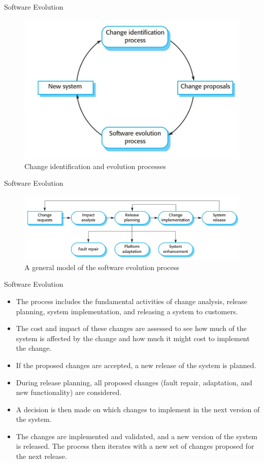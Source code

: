 \documentclass{beamer}
\begin{document}
\begin{frame}{Software Evolution}
	\begin{figure}
	\includegraphics[scale=.43]{img/m3_49}
	\caption{Change 
		identification and 
		evolution processes  }
\end{figure}
\end{frame}
\begin{frame}{Software Evolution}
	\begin{figure}
		\includegraphics[scale=.4]{img/m3_50}
		\caption{A general 
			model of the software 
			evolution process }
	\end{figure}
\end{frame}
\begin{frame}{Software Evolution}
\begin{itemize}
	\item The process includes the fundamental activities of change analysis, release planning, system implementation, and releasing a system to customers. 
\item The cost and impact of these changes are assessed to see how much of the system is affected by the change and how much it might cost to 
	implement the change. 
\item If the proposed changes are accepted, a new release of the system is planned. 
	\item During release planning, all proposed changes (fault repair, adaptation, and new functionality) are considered.
	\item A decision is then made on which changes to implement in the next version of the system. 
	\item The changes are implemented and validated, and a new version of the system is released. The process then iterates with a new set of changes 
	proposed for the next release. 
\end{itemize}
\end{frame}
\end{document}
